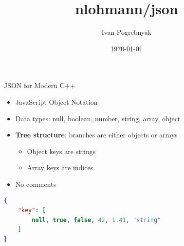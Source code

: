 \documentclass{slides}
\title{\texorpdfstring{\ttfamily nlohmann/json}{nlohmann/json}}
\author{Ivan Pogrebnyak}
\date{\today}
\makeatletter
\newcommand{\@slidetitle}{}
\newcommand{\slidetitle}[1]{\renewcommand{\@slidetitle}{#1}}
\makeatother
\begin{document}
\thispagestyle{empty}
\makeatletter
{\centering \huge \color{araBlue} \@title \par}
{\centering \Large \color{araBlue2} {JSON for Modern C++} \par}
{\centering \Large \@author \par}
{\centering \@date \par}
\makeatother
\pagebreak
\pagestyle{fancy}

\slidetitle{JSON}

\begin{itemize}
\item JavaScript Object Notation
\item Data types:
  null, boolean, number, string, array, object
\item {\bfseries Tree structure}: branches are either objects or arrays
  \begin{itemize}
    \item Object keys are strings
    \item Array keys are indices
  \end{itemize}
\item No comments
\end{itemize}

\begin{tcolorbox}
\begin{lstlisting}[language=json]
{
    "key": [
        null, true, false, 42, 1.41, "string"
    ]
}
\end{lstlisting}
\end{tcolorbox}

\pagebreak
\slidetitle{\lstinline{nlohmann/json}}
\end{document}
